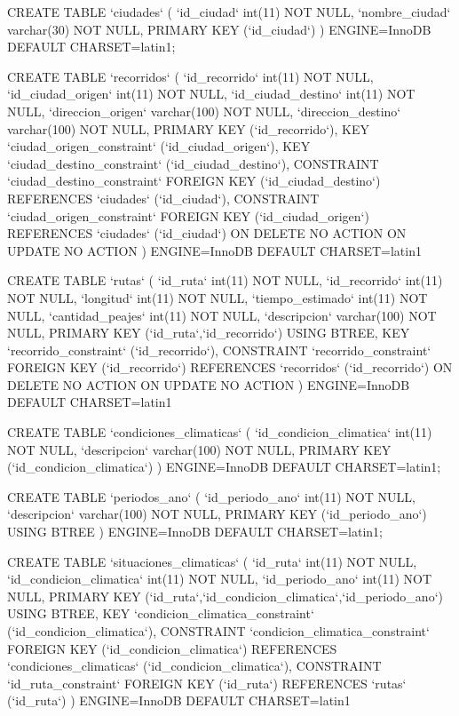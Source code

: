 \begin{sql}
CREATE TABLE  `ciudades` (
  `id_ciudad` int(11) NOT NULL,
  `nombre_ciudad` varchar(30) NOT NULL,
  PRIMARY KEY (`id_ciudad`)
) ENGINE=InnoDB DEFAULT CHARSET=latin1;

CREATE TABLE  `recorridos` (
  `id_recorrido` int(11) NOT NULL,
  `id_ciudad_origen` int(11) NOT NULL,
  `id_ciudad_destino` int(11) NOT NULL,
  `direccion_origen` varchar(100) NOT NULL,
  `direccion_destino` varchar(100) NOT NULL,
  PRIMARY KEY (`id_recorrido`),
  KEY `ciudad_origen_constraint` (`id_ciudad_origen`),
  KEY `ciudad_destino_constraint` (`id_ciudad_destino`),
  CONSTRAINT `ciudad_destino_constraint` FOREIGN KEY (`id_ciudad_destino`) REFERENCES `ciudades` (`id_ciudad`),
  CONSTRAINT `ciudad_origen_constraint` FOREIGN KEY (`id_ciudad_origen`) REFERENCES `ciudades` (`id_ciudad`) ON DELETE NO ACTION ON UPDATE NO ACTION
) ENGINE=InnoDB DEFAULT CHARSET=latin1

CREATE TABLE  `rutas` (
  `id_ruta` int(11) NOT NULL,
  `id_recorrido` int(11) NOT NULL,
  `longitud` int(11) NOT NULL,
  `tiempo_estimado` int(11) NOT NULL,
  `cantidad_peajes` int(11) NOT NULL,
  `descripcion` varchar(100) NOT NULL,
  PRIMARY KEY (`id_ruta`,`id_recorrido`) USING BTREE,
  KEY `recorrido_constraint` (`id_recorrido`),
  CONSTRAINT `recorrido_constraint` FOREIGN KEY (`id_recorrido`) 
  REFERENCES `recorridos` (`id_recorrido`) ON DELETE NO ACTION ON UPDATE NO ACTION
) ENGINE=InnoDB DEFAULT CHARSET=latin1

CREATE TABLE  `condiciones_climaticas` (
  `id_condicion_climatica` int(11) NOT NULL,
  `descripcion` varchar(100) NOT NULL,
  PRIMARY KEY (`id_condicion_climatica`)
) ENGINE=InnoDB DEFAULT CHARSET=latin1;

CREATE TABLE  `periodos_ano` (
  `id_periodo_ano` int(11) NOT NULL,
  `descripcion` varchar(100) NOT NULL,
  PRIMARY KEY (`id_periodo_ano`) USING BTREE
) ENGINE=InnoDB DEFAULT CHARSET=latin1;

CREATE TABLE  `situaciones_climaticas` (
  `id_ruta` int(11) NOT NULL,
  `id_condicion_climatica` int(11) NOT NULL,
  `id_periodo_ano` int(11) NOT NULL,
  PRIMARY KEY (`id_ruta`,`id_condicion_climatica`,`id_periodo_ano`) USING BTREE,
  KEY `condicion_climatica_constraint` (`id_condicion_climatica`),
  CONSTRAINT `condicion_climatica_constraint`
   FOREIGN KEY (`id_condicion_climatica`) REFERENCES `condiciones_climaticas` (`id_condicion_climatica`),
  CONSTRAINT `id_ruta_constraint` FOREIGN KEY (`id_ruta`) REFERENCES `rutas` (`id_ruta`)
) ENGINE=InnoDB DEFAULT CHARSET=latin1
\end{sql}

